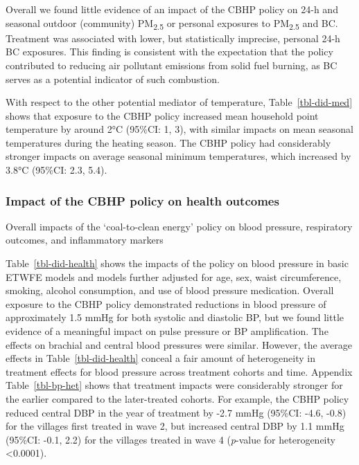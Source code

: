 \documentclass[
  letterpaper,
  DIV=11,
  numbers=noendperiod]{scrartcl}
\makeatletter
\renewenvironment{table}%
   {\renewcommand\familydefault\sfdefault
    \@float{table}}
   {\end@float}
\makeatother
\begin{document}
Overall we found little evidence of an impact of the CBHP policy on 24-h
and seasonal outdoor (community) PM\textsubscript{2.5} or personal
exposures to PM\textsubscript{2.5} and BC. Treatment was associated with
lower, but statistically imprecise, personal 24-h BC exposures. This
finding is consistent with the expectation that the policy contributed
to reducing air pollutant emissions from solid fuel burning, as BC
serves as a potential indicator of such combustion.

With respect to the other potential mediator of temperature,
Table~\ref{tbl-did-med} shows that exposure to the CBHP policy increased
mean household point temperature by around 2°C (95\%CI: 1, 3), with
similar impacts on mean seasonal temperatures during the heating season.
The CBHP policy had considerably stronger impacts on average seasonal
minimum temperatures, which increased by 3.8°C (95\%CI: 2.3, 5.4).

\subsubsection{Impact of the CBHP policy on health
outcomes}\label{impact-of-the-cbhp-policy-on-health-outcomes}

\begin{table}

\caption{\label{tbl-did-health}Overall impacts of the `coal-to-clean
energy' policy on blood pressure, respiratory outcomes, and inflammatory
markers}

\centering{

}

\end{table}%

Table~\ref{tbl-did-health} shows the impacts of the policy on blood
pressure in basic ETWFE models and models further adjusted for age, sex,
waist circumference, smoking, alcohol consumption, and use of blood
pressure medication. Overall exposure to the CBHP policy demonstrated
reductions in blood pressure of approximately 1.5 mmHg for both systolic
and diastolic BP, but we found little evidence of a meaningful impact on
pulse pressure or BP amplification. The effects on brachial and central
blood pressures were similar. However, the average effects in
Table~\ref{tbl-did-health} conceal a fair amount of heterogeneity in
treatment effects for blood pressure across treatment cohorts and time.
Appendix Table~\ref{tbl-bp-het} shows that treatment impacts were
considerably stronger for the earlier compared to the later-treated
cohorts. For example, the CBHP policy reduced central DBP in the year of
treatment by -2.7 mmHg (95\%CI: -4.6, -0.8) for the villages first
treated in wave 2, but increased central DBP by 1.1 mmHg (95\%CI: -0.1,
2.2) for the villages treated in wave 4 (\emph{p}-value for
heterogeneity \textless0.0001).
\end{document}
